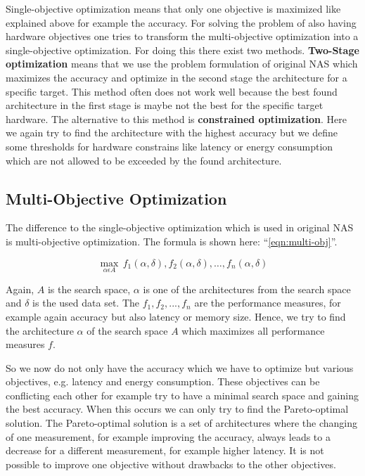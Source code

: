 \documentclass[conference]{IEEEtran}
\begin{document}
Single-objective optimization means that only one objective is maximized like explained above for example the accuracy. For solving the problem of also having hardware objectives one tries to transform the multi-objective optimization into a single-objective optimization. For doing this there exist two methods. \textbf{Two-Stage optimization} means that we use the problem formulation of original NAS which maximizes the accuracy and optimize in the second stage the architecture for a specific target. This method often does not work well because the best found architecture in the first stage is maybe not the best for the specific target hardware. The alternative to this method is \textbf{constrained optimization}. Here we again try to find the architecture with the highest accuracy but we define some thresholds for hardware constrains like latency or energy consumption which are not allowed to be exceeded by the found architecture. 

\subsection{Multi-Objective Optimization}

The difference to the single-objective optimization which is used in original NAS is multi-objective optimization. The formula is shown here: ``\eqref{eqn:multi-obj}''.
 
\begin{equation}
\label{eqn:multi-obj}
\max_{\alpha\epsilon A}\,f_{1}(\alpha, \delta),f_{2}(\alpha, \delta),\ldots ,f_{n}(\alpha, \delta)
\end{equation}     

Again, $A$ is the search space, $\alpha$ is one of the architectures from the search space and $\delta$ is the used data set. The $f_{1}, f_{2}, ..., f_{n}$ are the performance measures, for example again accuracy but also latency or memory size. Hence, we try to find the architecture $\alpha$ of the search space $A$ which maximizes all performance measures $f$. 

So we now do not only have the accuracy which we have to optimize but various objectives, e.g. latency and energy consumption. These objectives can be conflicting each other for example try to have a minimal search space and gaining the best accuracy. When this occurs we can only try to find the Pareto-optimal solution. The Pareto-optimal solution is a set of architectures where the changing of one measurement, for example improving the accuracy, always leads to a decrease for a different measurement, for example higher latency. It is not possible to improve one objective without drawbacks to the other objectives.
\end{document}

